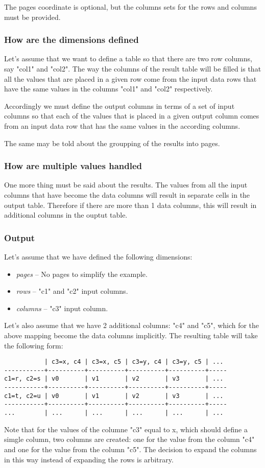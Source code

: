 \documentclass{report}
\begin{document}
The pages coordinate is optional, but the columns sets for the rows and columns
must be provided.

\subsubsection{How are the dimensions defined}
Let's assume that we want to define a table so that there are two row columns,
say "col1" and "col2". The way the columns of the result table will be filled
is that all the values that are placed in a given row come from the input data
rows that have the same values in the columns "col1" and "col2" respectively.

Accordingly we must define the output columns in terms of a set of input columns
so that each of the values that is placed in a given output column comes from
an input data row that has the same values in the according columns.

The same may be told about the groupping of the results into pages.

\subsubsection{How are multiple values handled}
One more thing must be said about the results. The values from all the input
columns that have become the data columns will result in separate cells in the
output table. Therefore if there are more than 1 data columns, this will result
in additional columns in the ouptut table.

\subsubsection{Output}
Let's assume that we have defined the following dimensions:
\begin{itemize}
	\item \textit{pages} -- No pages to simplify the example.
	\item \textit{rows} -- "c1" and "c2" input columns.
	\item \textit{columns} -- "c3" input column.
\end{itemize}

Let's also assume that we have 2 additional columns: "c4" and "c5", which for
the above mapping become the data columns implicitly. The resulting table will
take the following form:

\begin{verbatim}
           | c3=x, c4 | c3=x, c5 | c3=y, c4 | c3=y, c5 | ...
-----------+----------+----------+----------+----------+-----
c1=r, c2=s | v0       | v1       | v2       | v3       | ...
-----------+----------+----------+----------+----------+-----
c1=t, c2=u | v0       | v1       | v2       | v3       | ...
-----------+----------+----------+----------+----------+-----
...        | ...      | ...      | ...      | ...      | ...
\end{verbatim}

Note that for the values of the columne "c3" equal to x, which should define
a simgle column, two columns are created: one for the value from the column
"c4" and one for the value from the column "c5". The decision to expand the
columns in this way instead of expanding the rows is arbitrary.
\end{document}
